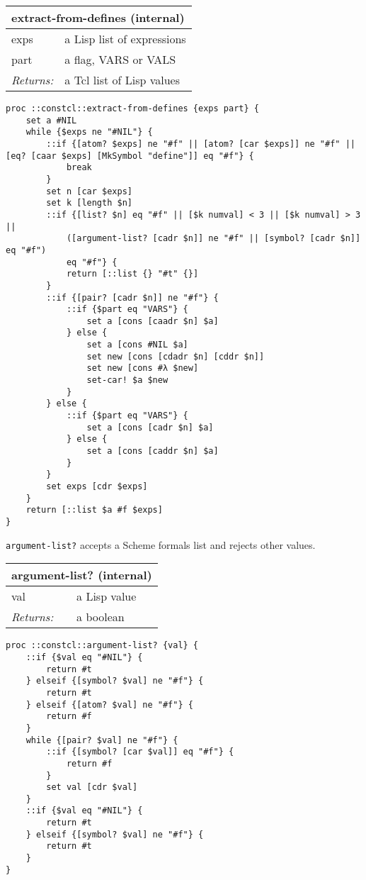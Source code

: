 \documentclass{report}
\begin{document}
\begin{tabular}{ |l l| }
\hline
\multicolumn{2}{|l|}{extract-from-defines (internal)} \\
\hline
exps & a Lisp list of expressions \\
part & a flag, VARS or VALS \\
\textit{Returns:} & a Tcl list of Lisp values \\
\hline
\end{tabular}

\noindent\makebox[\linewidth]{\rule{\linewidth}{0.4pt}}
\begin{lstlisting}
proc ::constcl::extract-from-defines {exps part} {
    set a #NIL
    while {$exps ne "#NIL"} {
        ::if {[atom? $exps] ne "#f" || [atom? [car $exps]] ne "#f" || [eq? [caar $exps] [MkSymbol "define"]] eq "#f"} {
            break
        }
        set n [car $exps]
        set k [length $n]
        ::if {[list? $n] eq "#f" || [$k numval] < 3 || [$k numval] > 3 ||
            ([argument-list? [cadr $n]] ne "#f" || [symbol? [cadr $n]] eq "#f")
            eq "#f"} {
            return [::list {} "#t" {}]
        }
        ::if {[pair? [cadr $n]] ne "#f"} {
            ::if {$part eq "VARS"} {
                set a [cons [caadr $n] $a]
            } else {
                set a [cons #NIL $a]
                set new [cons [cdadr $n] [cddr $n]]
                set new [cons #λ $new]
                set-car! $a $new
            }
        } else {
            ::if {$part eq "VARS"} {
                set a [cons [cadr $n] $a]
            } else {
                set a [cons [caddr $n] $a]
            }
        }
        set exps [cdr $exps]
    }
    return [::list $a #f $exps]
}
\end{lstlisting}
\noindent\makebox[\linewidth]{\rule{\linewidth}{0.4pt}}

\texttt{argument-list?} accepts a Scheme formals list and rejects other values.

\begin{tabular}{ |l l| }
\hline
\multicolumn{2}{|l|}{argument-list? (internal)} \\
\hline
val & a Lisp value \\
\textit{Returns:} & a boolean \\
\hline
\end{tabular}

\noindent\makebox[\linewidth]{\rule{\linewidth}{0.4pt}}
\begin{lstlisting}
proc ::constcl::argument-list? {val} {
    ::if {$val eq "#NIL"} {
        return #t
    } elseif {[symbol? $val] ne "#f"} {
        return #t
    } elseif {[atom? $val] ne "#f"} {
        return #f
    }
    while {[pair? $val] ne "#f"} {
        ::if {[symbol? [car $val]] eq "#f"} {
            return #f
        }
        set val [cdr $val]
    }
    ::if {$val eq "#NIL"} {
        return #t
    } elseif {[symbol? $val] ne "#f"} {
        return #t
    }
}
\end{lstlisting}
\noindent\makebox[\linewidth]{\rule{\linewidth}{0.4pt}}
\end{document}
